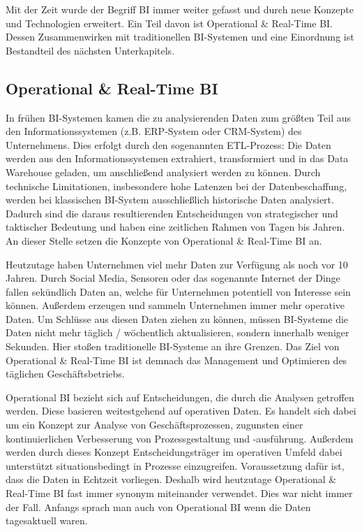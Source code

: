 Mit der Zeit wurde der Begriff \ac{BI} immer weiter gefasst und durch neue Konzepte und Technologien erweitert. Ein Teil davon ist Operational \& Real-Time \ac{BI}. Dessen Zusammenwirken mit traditionellen BI-Systemen und eine Einordnung ist Bestandteil des nächsten Unterkapitels.

\subsection{Operational \& Real-Time BI}
In frühen BI-Systemen kamen die zu analysierenden Daten zum größten Teil aus den Informationssystemen (z.B. ERP-System oder CRM-System) des Unternehmens. Dies erfolgt durch den sogenannten ETL-Prozess: Die Daten werden aus den Informationssystemen extrahiert, transformiert und in das Data Warehouse geladen, um anschließend analysiert werden zu können. \autocite[Vgl.][S. 132]{Glucho2008} Durch technische Limitationen, insbesondere hohe Latenzen bei der Datenbeschaffung, werden bei klassischen BI-System ausschließlich historische Daten analysiert. Dadurch sind die daraus resultierenden Entscheidungen von strategischer und taktischer Bedeutung und haben eine zeitlichen Rahmen von Tagen bis Jahren. \autocite[Vgl.][S. 36]{Sandu2008} An dieser Stelle setzen die Konzepte von Operational \& Real-Time BI an. 

Heutzutage haben Unternehmen viel mehr Daten zur Verfügung als noch vor 10 Jahren. Durch Social Media, Sensoren oder das sogenannte Internet der Dinge fallen sekündlich Daten an, welche für Unternehmen potentiell von Interesse sein können. Außerdem erzeugen und sammeln Unternehmen immer mehr operative Daten. Um Schlüsse aus diesen Daten ziehen zu können, müssen BI-Systeme die Daten nicht mehr täglich / wöchentlich aktualisieren, sondern innerhalb weniger Sekunden. Hier stoßen traditionelle BI-Systeme an ihre Grenzen. \autocite[Vgl.][S. 257]{rutz} Das Ziel von Operational \& Real-Time BI ist demnach das Management und Optimieren des täglichen Geschäftsbetriebs. \autocite[Vgl.][S. 36]{Sandu2008}

Operational BI bezieht sich auf Entscheidungen, die durch die Analysen getroffen werden. Diese basieren weitestgehend auf operativen Daten. Es handelt sich dabei um ein Konzept zur Analyse von Geschäftsprozessen, zugunsten einer kontinuierlichen Verbesserung von Prozessgestaltung und -ausführung. \autocite[Vgl.][S. 148]{inproceedings} Außerdem werden durch dieses Konzept Entscheidungsträger im operativen Umfeld dabei unterstützt situationsbedingt in Prozesse einzugreifen. Voraussetzung dafür ist, dass die Daten in Echtzeit vorliegen. Deshalb wird heutzutage Operational \& Real-Time BI fast immer synonym miteinander verwendet. Dies war nicht immer der Fall. Anfangs sprach man auch von Operational BI wenn die Daten tagesaktuell waren. \autocite[Vgl.][S. 5]{eckerson} 

